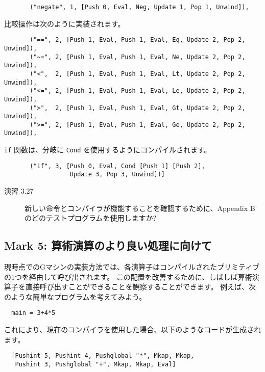 \documentclass{jarticle}
\begin{document}
\begin{verbatim}
       ("negate", 1, [Push 0, Eval, Neg, Update 1, Pop 1, Unwind]),
\end{verbatim}

比較操作は次のように実装されます。

\begin{verbatim}
       ("==", 2, [Push 1, Eval, Push 1, Eval, Eq, Update 2, Pop 2, Unwind]),
       ("~=", 2, [Push 1, Eval, Push 1, Eval, Ne, Update 2, Pop 2, Unwind]),
       ("<",  2, [Push 1, Eval, Push 1, Eval, Lt, Update 2, Pop 2, Unwind]),
       ("<=", 2, [Push 1, Eval, Push 1, Eval, Le, Update 2, Pop 2, Unwind]),
       (">",  2, [Push 1, Eval, Push 1, Eval, Gt, Update 2, Pop 2, Unwind]),
       (">=", 2, [Push 1, Eval, Push 1, Eval, Ge, Update 2, Pop 2, Unwind]),
\end{verbatim}

\texttt{if} 関数は、分岐に \texttt{Cond} を使用するようにコンパイルされます。

\begin{verbatim}
       ("if", 3, [Push 0, Eval, Cond [Push 1] [Push 2],
                  Update 3, Pop 3, Unwind])]
\end{verbatim}

\begin{description}
	\item[演習 3.27] 新しい命令とコンパイラが機能することを確認するために、Appendix B のどのテストプログラムを使用しますか?
\end{description}
\newpage

\subsection{Mark 5: 算術演算のより良い処理に向けて}

現時点でのGマシンの実装方法では、各演算子はコンパイルされたプリミティブの1つを経由して呼び出されます。
この配置を改善するために、しばしば算術演算子を直接呼び出すことができることを観察することができます。
例えば、次のような簡単なプログラムを考えてみよう。

\begin{verbatim}
  main = 3+4*5
\end{verbatim}

これにより、現在のコンパイラを使用した場合、以下のようなコードが生成されます。

\begin{verbatim}
  [Pushint 5, Pushint 4, Pushglobal "*", Mkap, Mkap,
   Pushint 3, Pushglobal "+", Mkap, Mkap, Eval]
\end{verbatim}
\end{document}
